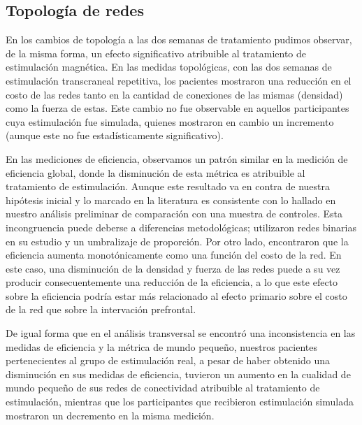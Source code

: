 \subsection{Topología de redes}
En los cambios de topología a las dos semanas de tratamiento pudimos observar, de la misma forma, un efecto significativo atribuible al tratamiento de estimulación magnética. En las medidas topológicas, con las dos semanas de estimulación transcraneal repetitiva, los pacientes mostraron una reducción en el costo de las redes tanto en la cantidad de conexiones de las mismas (densidad) como la fuerza de estas. Este cambio no fue observable en aquellos participantes cuya estimulación fue simulada, quienes mostraron en cambio un incremento (aunque este no fue estadísticamente significativo).\par
En las mediciones de eficiencia, observamos un patrón similar en la medición de eficiencia global, donde la disminución de esta métrica es atribuible al tratamiento de estimulación. Aunque este resultado va en contra de nuestra hipótesis inicial y lo marcado en la literatura \parencite{Wang2015a} es consistente con lo hallado en nuestro análisis preliminar de comparación con una muestra de controles. Esta incongruencia puede deberse a diferencias metodológicas; \textcite{Wang2015a} utilizaron redes binarias en su estudio y un umbralizaje de proporción. Por otro lado, \textcite{Achard2007}encontraron que la eficiencia aumenta monotónicamente como una función del costo de la red. En este caso, una disminución de la densidad y fuerza de las redes puede a su vez producir consecuentemente una reducción de la eficiencia, a lo que este efecto sobre la eficiencia podría estar más relacionado al efecto primario sobre el costo de la red que sobre la intervación prefrontal. \par
De igual forma que en el análisis transversal se encontró una inconsistencia en las medidas de eficiencia y la métrica de mundo pequeño, nuestros pacientes pertenecientes al grupo de estimulación real, a pesar de haber obtenido una disminución en sus medidas de eficiencia, tuvieron un aumento en la cualidad de mundo pequeño de sus redes de conectividad atribuible al tratamiento de estimulación, mientras que los participantes que recibieron estimulación simulada mostraron un decremento en la misma medición. \par
